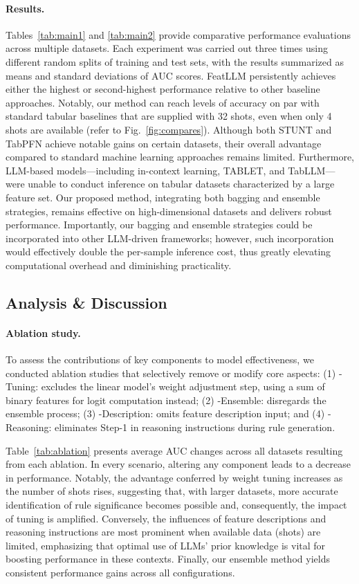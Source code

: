 \vspace*{-0.12in}
\paragraph{Results.}
Tables~\ref{tab:main1} and \ref{tab:main2} provide comparative performance evaluations across multiple datasets. Each experiment was carried out three times using different random splits of training and test sets, with the results summarized as means and standard deviations of AUC scores. \textsf{FeatLLM} persistently achieves either the highest or second-highest performance relative to other baseline approaches. Notably, our method can reach levels of accuracy on par with standard tabular baselines that are supplied with 32 shots, even when only 4 shots are available (refer to Fig.~\ref{fig:compares}). Although both STUNT and TabPFN achieve notable gains on certain datasets, their overall advantage compared to standard machine learning approaches remains limited. Furthermore, LLM-based models—including in-context learning, TABLET, and TabLLM—were unable to conduct inference on tabular datasets characterized by a large feature set. Our proposed method, integrating both bagging and ensemble strategies, remains effective on high-dimensional datasets and delivers robust performance. Importantly, our bagging and ensemble strategies could be incorporated into other LLM-driven frameworks; however, such incorporation would effectively double the per-sample inference cost, thus greatly elevating computational overhead and diminishing practicality.

\subsection{Analysis \& Discussion}
\label{sec:analysis}
\paragraph{Ablation study.} To assess the contributions of key components to model effectiveness, we conducted ablation studies that selectively remove or modify core aspects: (1) \textsf{-Tuning}: excludes the linear model’s weight adjustment step, using a sum of binary features for logit computation instead; (2) \textsf{-Ensemble}: disregards the ensemble process; (3) \textsf{-Description}: omits feature description input; and (4) \textsf{-Reasoning}: eliminates Step-1 in reasoning instructions during rule generation.

Table~\ref{tab:ablation} presents average AUC changes across all datasets resulting from each ablation. In every scenario, altering any component leads to a decrease in performance. Notably, the advantage conferred by weight tuning increases as the number of shots rises, suggesting that, with larger datasets, more accurate identification of rule significance becomes possible and, consequently, the impact of tuning is amplified. Conversely, the influences of feature descriptions and reasoning instructions are most prominent when available data (shots) are limited, emphasizing that optimal use of LLMs’ prior knowledge is vital for boosting performance in these contexts. Finally, our ensemble method yields consistent performance gains across all configurations.

